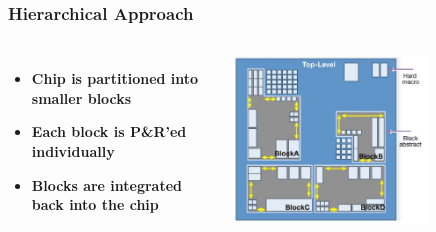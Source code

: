 \documentclass[compress]{beamer}
\begin{document}
\begin{frame}
	\frametitle{Hierarchical Approach}
		\begin{columns}	
		\begin{itemize}
			\item \textbf{Chip is partitioned into smaller blocks}
		\item \textbf{Each block is P\&R'ed
		individually }
		\item \textbf{Blocks are integrated
		back into the chip	}		
		\end{itemize}
		\begin{center}
			\includegraphics[width=0.7\textwidth]{partitioning}
		\end{center}
	\end{columns}
\end{frame}
\end{document}

